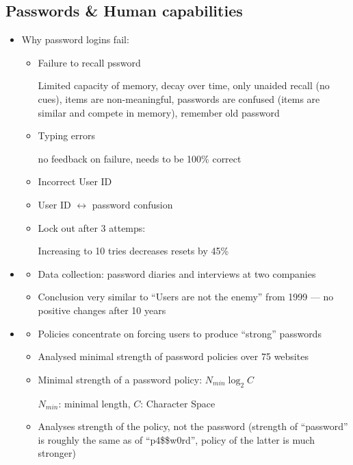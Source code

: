 \documentclass[a4paper]{scrartcl}
\begin{document}
\subsection{Passwords \& Human capabilities}
\begin{itemize}
	\item
		Why password logins fail:
		\begin{itemize}
			\item
				Failure to recall pssword

				Limited capacity of memory, decay over time, only unaided recall (no cues), items are non-meaningful, passwords are confused (items are similar and compete in memory), remember old password
			\item
				Typing errors

				no feedback on failure, needs to be 100\% correct
			\item
				Incorrect User ID
			\item
				User ID $\leftrightarrow$ password confusion
			\item
				Lock out after 3 attemps:

				Increasing to 10 tries decreases resets by 45\%
		\end{itemize}
	\item
		\begin{itemize}
			\item
				Data collection:  password diaries and interviews at two companies
			\item
				Conclusion very similar to \enquote{Users are not the enemy} from 1999 --- no positive changes after 10 years
		\end{itemize}
	\item
		\begin{itemize}
			\item
				Policies concentrate on forcing users to produce \enquote{strong} passwords
			\item
				Analysed  minimal strength of password policies over 75 websites
			\item
				Minimal strength of a password policy: $N_{min} \log_2 C$

				$N_{min}$: minimal length, $C$: Character Space
			\item
				Analyses strength of the policy, not the password (strength of \enquote{password} is roughly the same as of \enquote{p4\$\$w0rd}, policy of the latter is much stronger)
		\end{itemize}
\end{itemize}
\end{document}
